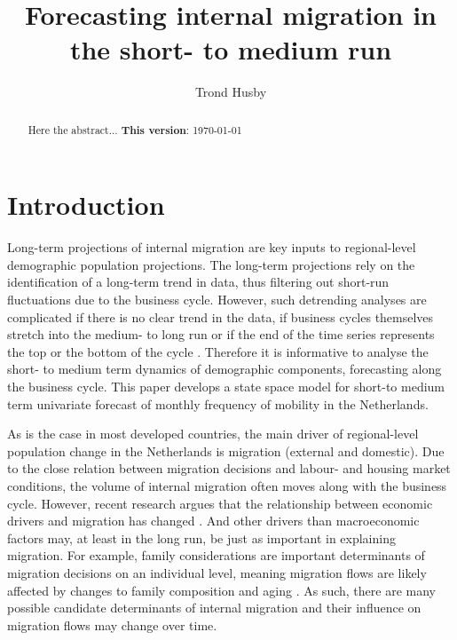\documentclass[12pt, a4paper]{article}
\begin{document}
\title{Forecasting internal migration in the short- to medium run}

\author{Trond Husby}
\maketitle


\begin{abstract}
Here the abstract...
\bigskip
\textbf{This version}: {\today}
\end{abstract}

\section{Introduction}\label{introduction}

Long-term projections of internal migration are key inputs to
regional-level demographic population projections. The long-term
projections rely on the identification of a long-term trend in data,
thus filtering out short-run fluctuations due to the business cycle.
However, such detrending analyses are complicated if there is no clear
trend in the data, if business cycles themselves stretch into the
medium- to long run or if the end of the time series represents the top or the bottom
of the cycle \citep{canova1998detrending, hamilton2018}. Therefore it is
informative to analyse the short- to medium term dynamics of demographic
components, forecasting along the business cycle. This paper develops a
state space model for short-to medium term univariate forecast of
monthly frequency of mobility in the Netherlands.

As is the case in most developed countries, the main driver of
regional-level population change in the Netherlands is migration
(external and domestic). Due to the close relation between migration
decisions and labour- and housing market conditions, the volume of
internal migration often moves along with the business cycle. However,
recent research argues that the relationship between economic drivers
and migration has changed \citep{kaplan2017understanding}. And other
drivers than macroeconomic factors may, at least in the long run, be just as important in
explaining migration. For example, family considerations are important
determinants of migration decisions on an individual level, meaning
migration flows are likely affected by changes to family composition
and aging \citep[see e.g.][]{mulder2018putting}. As such, there are many
possible candidate determinants of internal migration and their
influence on migration flows may change over time.
\end{document}
